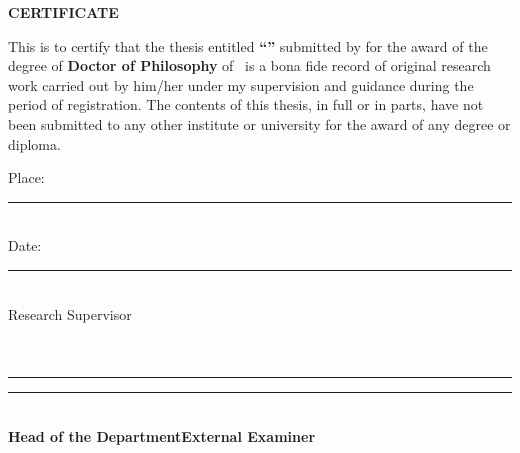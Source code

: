 \thispagestyle{empty}
\begin{center}
{\large \bfseries CERTIFICATE}
\end{center}
\vspace{1cm}

\noindent
This is to certify that the thesis entitled
\textbf{``\thesistitle''} submitted by \textbf{\researcher} for the
award of the degree of \textbf{Doctor of Philosophy} of \institution\
is a bona fide record of original research work carried out by him/her
under my supervision and guidance during the period of registration.
The contents of this thesis, in full or in parts, have not been
submitted to any other institute or university for the award of any
degree or diploma.

\vspace{2cm}
\noindent
Place: \rule{4cm}{0.4pt}\hfill \\[1.5cm]
Date: \rule{4cm}{0.4pt} \hfill \textbf{\supervisor}\\
\hspace*{6.5cm} Research Supervisor\\
\hspace*{6.5cm} \department\\
\hspace*{6.5cm} \institution\\

\vspace{2cm}
\noindent
\rule{5cm}{0.4pt}\hfill\rule{5cm}{0.4pt}\\
\textbf{Head of the Department}\hspace*{2.5cm}\textbf{External Examiner}
\clearpage
